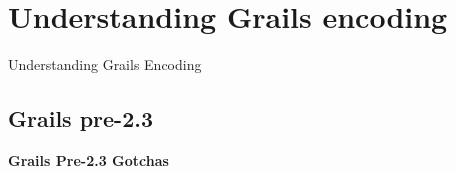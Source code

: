 
\section{Understanding Grails encoding}

{
\begin{frame}[plain]
    \Huge\bfseries
    \vspace{-3.5cm}
    \begin{flushright}\color{white}Understanding Grails Encoding\end{flushright}
\end{frame}
}


\subsection{Grails pre-2.3}

\begin{frame}[plain]
    \begin{center}
      \Huge\bfseries
      Grails Pre-2.3 Gotchas
    \end{center}
\end{frame}


